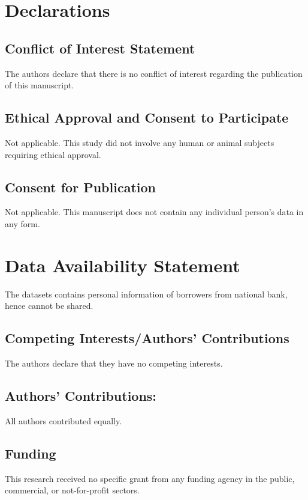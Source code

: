 \documentclass[a4paper]{article}
\begin{document}
\section*{Declarations}

\subsection*{Conflict of Interest Statement}
The authors declare that there is no conflict of interest regarding the publication of this manuscript.

\subsection*{Ethical Approval and Consent to Participate}
Not applicable. This study did not involve any human or animal subjects requiring ethical approval.

\subsection*{Consent for Publication}
Not applicable. This manuscript does not contain any individual person’s data in any form.

\section*{Data Availability Statement}
The datasets contains personal information of borrowers from national bank, hence cannot be shared.

\subsection*{Competing Interests/Authors' Contributions}
The authors declare that they have no competing interests.

\subsection*{Authors' Contributions:}
All authors contributed equally.

\subsection*{Funding}
This research received no specific grant from any funding agency in the public, commercial, or not-for-profit sectors.



\end{document}
